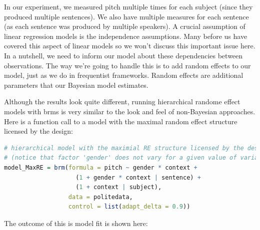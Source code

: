 \documentclass[nobib]{tufte-handout}
\begin{document}
In our experiment, we measured pitch multiple times for each subject (since they produced multiple sentences). We also have multiple measures for each sentence (as each sentence was produced by multiple speakers). A crucial assumption of linear regression models is the independence assumptions. Many before us have covered this aspect of linear models \citep[e.g.][]{Winter2013:Linear-models-a, clark1973language} so we won't discuss this important issue here. In a nutshell, we need to inform our model about these dependencies between observations. The way we’re going to handle this is to add random effects to our model, just as we  do in frequentist frameworks. Random effects are additional parameters that our Bayesian model estimates.

Although the results look quite different, running hierarchical randome effect models  with \textrm{brms} is very similar to the look and feel of non-Bayesian approaches. Here is a function call to a model with the maximal random effect structure licensed by the design:

\begin{minipage}[]{1\textwidth}
\begin{lstlisting}[language=R]
# hierarchical model with the maximial RE structure licensed by the design
# (notice that factor 'gender' does not vary for a given value of variable 'subject')
model_MaxRE = brm(formula = pitch ~ gender * context +
                    (1 + gender * context | sentence) +
                    (1 + context | subject),
                  data = politedata,
                  control = list(adapt_delta = 0.9))
\end{lstlisting}
\end{minipage}

The outcome of this is model fit is shown here:

\medskip
\end{document}
